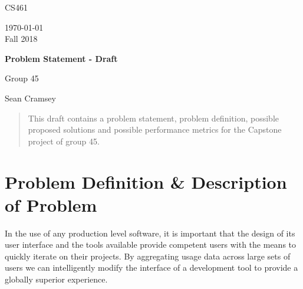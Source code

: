 \documentclass[onecolumn, draftclsnofoot,10pt, compsoc]{IEEEtran}
\def \GroupNumber{ 45}
\def \GroupMemberOne{Sean Cramsey}
\def \ProjectName{Problem Statement - Draft}
\begin{document}
\begin{titlepage}
    \begin{singlespace}
        \hfill 
        \par\vspace{.2in}
        \centering
        \scshape{
            \huge CS461 \par
            {\large\today\\Fall 2018}\par
            \vspace{.5in}
            \textbf{\Huge\ProjectName}\par
            \vfill
            Group\GroupNumber\par
            \vspace{5pt}
            {\Large
                \GroupMemberOne\par
            }
            \vspace{20pt}
    
        }
        \begin{abstract}
            This draft contains a problem statement, problem definition, possible proposed solutions and possible performance metrics for the Capstone project of group 45.
        \end{abstract}
    \end{singlespace}
\end{titlepage}
\newpage
{}
\clearpage

    
\section{Problem Definition \& Description of Problem}

In the use of any production level software, it is important that the design of its user interface and the tools available provide competent users with the means to quickly iterate on their projects.  By aggregating usage data across large sets of users we can intelligently modify the interface of a development tool to provide a globally superior experience.  
\end{document}
